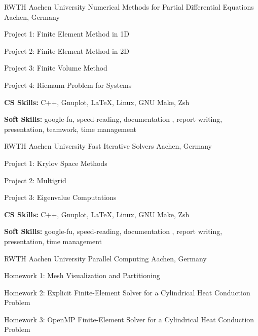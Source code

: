 \begin{cventries}
  \cventry
    {RWTH Aachen University} %
    {Numerical Methods for Partial Differential Equations} %
    {Aachen, Germany} %
    {} %
    {
      \begin{cvitems} %
        \item {Project 1: Finite Element Method in 1D}
        \item {Project 2: Finite Element Method in 2D}
        \item {Project 3: Finite Volume Method}
        \item {Project 4: Riemann Problem for Systems}
        \item {\textbf{CS Skills:} C++, Gnuplot, LaTeX, Linux, GNU Make, Zsh}
        \item {\textbf{Soft Skills:} google-fu, speed-reading, documentation , report writing, presentation, teamwork, time management}
      \end{cvitems}
    }
  \cventry
    {RWTH Aachen University} %
    {Fast Iterative Solvers} %
    {Aachen, Germany} %
    {} %
    {
      \begin{cvitems} %
        \item {Project 1: Krylov Space Methods}
        \item {Project 2: Multigrid}
        \item {Project 3: Eigenvalue Computations}
        \item {\textbf{CS Skills:} C++, Gnuplot, LaTeX, Linux, GNU Make, Zsh}
        \item {\textbf{Soft Skills:} google-fu, speed-reading, documentation , report writing, presentation, time management}
      \end{cvitems}
    }
  \cventry
    {RWTH Aachen University} %
    {Parallel Computing} %
    {Aachen, Germany} %
    {} %
    {
      \begin{cvitems} %
        \item {Homework 1: Mesh Visualization and Partitioning}
        \item {Homework 2: Explicit Finite-Element Solver for a Cylindrical Heat Conduction Problem}
        \item {Homework 3: OpenMP Finite-Element Solver for a Cylindrical Heat Conduction Problem}

\end{cvitems}}
\end{cventries}
